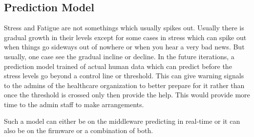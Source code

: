 \subsection{Prediction Model}
Stress and Fatigue are not somethings which usually spikes out. Usually there is gradual growth in their levels except for some cases in stress which can spike out when things go sideways out of nowhere or when you hear a very bad news. But usually, one case see the gradual incline or decline. In the future iterations, a prediction model trained of actual human data which can predict before the stress levels go beyond a control line or threshold. This can give warning signals to the admins of the healthcare organization to better prepare for it rather than once the threshold is crossed only then provide the help. This would provide more time to the admin staff to make arrangements. 

Such a model can either be on the middleware predicting in real-time or it can also be on the firmware or a combination of both.  


